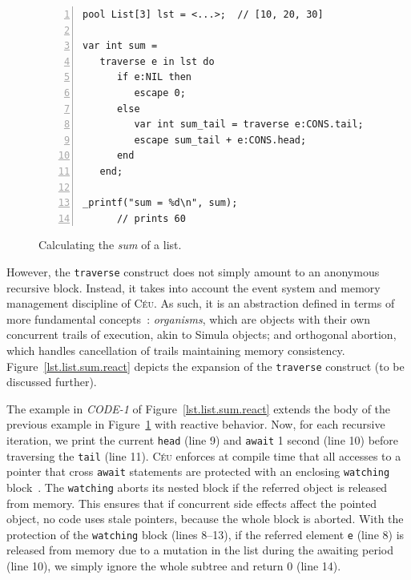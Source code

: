 \documentclass{sig-alternate}
\newcommand{\CEU}{\textsc{C\'{e}u}\xspace}
\newcommand{\code}[1] {{\small{\texttt{#1}}}}
\begin{document}
\begin{figure}[t]
\begin{lstlisting}[numbers=left,xleftmargin=3em]
pool List[3] lst = <...>;  // [10, 20, 30]

var int sum =
   traverse e in lst do
      if e:NIL then
         escape 0;
      else
         var int sum_tail = traverse e:CONS.tail;
         escape sum_tail + e:CONS.head;
      end
   end;

_printf("sum = %d\n", sum);
      // prints 60
\end{lstlisting}
\caption{
Calculating the \emph{sum} of a list.
\label{lst.list.sum}
}
\end{figure}


However, the \code{traverse} construct does not simply amount to an anonymous 
recursive block.
Instead, it takes into account the event system and memory management 
discipline of \CEU.
As such, it is an abstraction defined in terms of more fundamental 
concepts~\cite{ceu.mod15}:
\emph{organisms}, which are objects with their own concurrent trails of 
execution, akin to Simula objects;
and orthogonal abortion, which handles cancellation of trails maintaining 
memory consistency.
%
Figure~\ref{lst.list.sum.react} depicts the expansion of the \code{traverse} 
construct (to be discussed further).

The example in \emph{CODE-1} of Figure~\ref{lst.list.sum.react} extends the 
body of the previous example in Figure~\ref{lst.list.sum} with reactive 
behavior.
%
Now, for each recursive iteration, we print the current \code{head} (line 9) 
and \code{await} 1 second (line 10) before traversing the \code{tail} (line 
11).
%
\CEU enforces at compile time that all accesses to a pointer that cross 
\code{await} statements are protected with an enclosing \code{watching} 
block~\cite{ceu.mod15}.
The \code{watching} aborts its nested block if the referred object is released 
from memory.
%
This ensures that if concurrent side effects affect the pointed object, no code 
uses stale pointers, because the whole block is aborted.
%
With the protection of the \code{watching} block (lines 8--13), if the referred 
element \code{e} (line 8) is released from memory due to a mutation in the list 
during the awaiting period (line 10), we simply ignore the whole subtree and 
return 0 (line 14).
\end{document}
